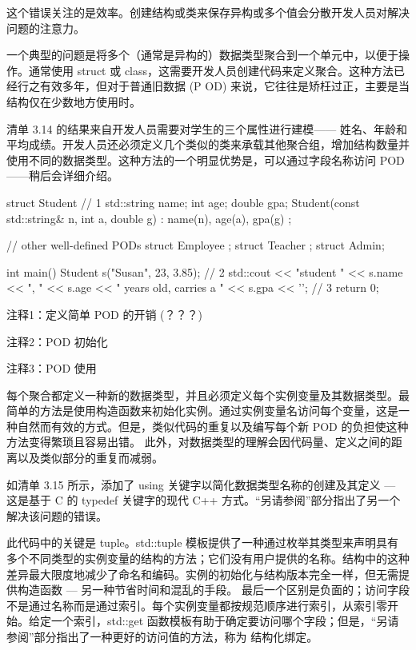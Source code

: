 这个错误关注的是效率。创建结构或类来保存异构或多个值会分散开发人员对解决问题的注意力。


一个典型的问题是将多个（通常是异构的）数据类型聚合到一个单元中，以便于操作。通常使用 struct 或 class，这需要开发人员创建代码来定义聚合。这种方法已经行之有效多年，但对于普通旧数据 (P OD) 来说，它往往是矫枉过正，主要是当结构仅在少数地方使用时。

清单 3.14 的结果来自开发人员需要对学生的三个属性进行建模—— 姓名、年龄和平均成绩。开发人员还必须定义几个类似的类来承载其他聚合组，增加结构数量并使用不同的数据类型。这种方法的一个明显优势是，可以通过字段名称访问 POD——稍后会详细介绍。


\begin{cpp}
struct Student { // 1
  std::string name;
  int age;
  double gpa;
  Student(const std::string& n, int a, double g) : name(n), age(a), gpa(g) {}
};

// other well-defined PODs
struct Employee {};
struct Teacher {};
struct Admin{};

int main() {
  Student s("Susan", 23, 3.85); // 2
  std::cout << "student " << s.name << ", " << s.age << " years old, carries a "
            << s.gpa << '\n'; // 3
  return 0;
}
\end{cpp}

{\footnotesize
注释1：定义简单 POD 的开销 (？？？)

注释2：POD 初始化

注释3：POD 使用
}


每个聚合都定义一种新的数据类型，并且必须定义每个实例变量及其数据类型。最简单的方法是使用构造函数来初始化实例。通过实例变量名访问每个变量，这是一种自然而有效的方式。但是，类似代码的重复以及编写每个新 POD 的负担使这种方法变得繁琐且容易出错。
此外，对数据类型的理解会因代码量、定义之间的距离以及类似部分的重复而减弱。


如清单 3.15 所示，添加了 using 关键字以简化数据类型名称的创建及其定义 — 这是基于 C 的 typedef 关键字的现代 C++ 方式。“另请参阅”部分指出了另一个解决该问题的错误。

此代码中的关键是 tuple。std::tuple 模板提供了一种通过枚举其类型来声明具有多个不同类型的实例变量的结构的方法；它们没有用户提供的名称。结构中的这种差异最大限度地减少了命名和编码。实例的初始化与结构版本完全一样，但无需提供构造函数 — 另一种节省时间和混乱的手段。
最后一个区别是负面的；访问字段不是通过名称而是通过索引。每个实例变量都按规范顺序进行索引，从索引零开始。给定一个索引，std::get 函数模板有助于确定要访问哪个字段；但是，“另请参阅”部分指出了一种更好的访问值的方法，称为 结构化绑定。


